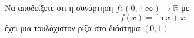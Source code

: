 Να αποδείξετε ότι η συνάρτηση $ f:(0,+\infty)\to\mathbb{R} $ με 
\[ f(x)=\ln{x}+x \] έχει μια τουλάχιστον ρίζα στο διάστημα $ (0,1) $.
